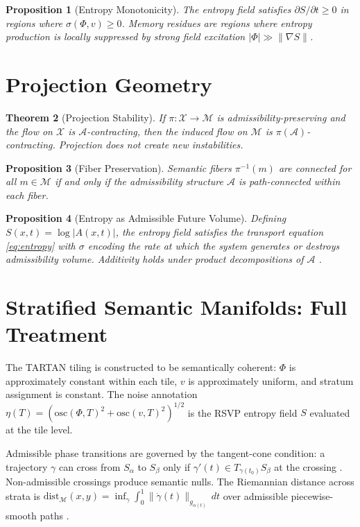 \documentclass[12pt, a4paper]{article}
\theoremstyle{rsvpstyle}
\newtheorem{theorem}{Theorem}[section]
\newtheorem{proposition}[theorem]{Proposition}
\theoremstyle{definition}
\newcommand{\Traj}{\mathcal{X}}
\newcommand{\OpMan}{\mathcal{M}}
\newcommand{\Adm}{\mathcal{A}}
\begin{document}
\begin{proposition}[Entropy Monotonicity]
The entropy field satisfies $\partial S/\partial t \geq 0$ in regions where
$\sigma(\Phi,v) \geq 0$. Memory residues are regions where entropy production
is locally suppressed by strong field excitation $|\Phi| \gg \|\nabla S\|$.
\end{proposition}

\section{Projection Geometry}

\begin{theorem}[Projection Stability]
If $\pi : \Traj \to \OpMan$ is admissibility-preserving and the flow on
$\Traj$ is $\Adm$-contracting, then the induced flow on $\OpMan$ is
$\pi(\Adm)$-contracting. Projection does not create new instabilities.
\end{theorem}

\begin{proposition}[Fiber Preservation]
Semantic fibers $\pi^{-1}(m)$ are connected for all $m \in \OpMan$ if and only
if the admissibility structure $\Adm$ is path-connected within each fiber.
\end{proposition}

\begin{proposition}[Entropy as Admissible Future Volume]
Defining $S(x,t) = \log|A(x,t)|$, the entropy field satisfies the transport
equation \eqref{eq:entropy} with $\sigma$ encoding the rate at which the
system generates or destroys admissibility volume. Additivity holds under
product decompositions of $\Adm$ \citep{Cover2006}.
\end{proposition}

\section{Stratified Semantic Manifolds: Full Treatment}

The TARTAN tiling is constructed to be semantically coherent: $\Phi$ is
approximately constant within each tile, $v$ is approximately uniform, and
stratum assignment is constant. The noise annotation
$\eta(T) = (\mathrm{osc}(\Phi,T)^2 + \mathrm{osc}(v,T)^2)^{1/2}$ is the
RSVP entropy field $S$ evaluated at the tile level.

Admissible phase transitions are governed by the tangent-cone condition:
a trajectory $\gamma$ can cross from $S_\alpha$ to $S_\beta$ only if
$\gamma'(t) \in T_{\gamma(t_0)}S_\beta$ at the crossing \citep{Whitney1965,Mather1973}.
Non-admissible crossings produce semantic nulls. The Riemannian distance across
strata is $\mathrm{dist}_\OpMan(x,y) = \inf_\gamma \int_0^1 \|\dot\gamma(t)\|_{g_{\alpha(t)}}\,dt$
over admissible piecewise-smooth paths \citep{Lee2013}.
\end{document}
